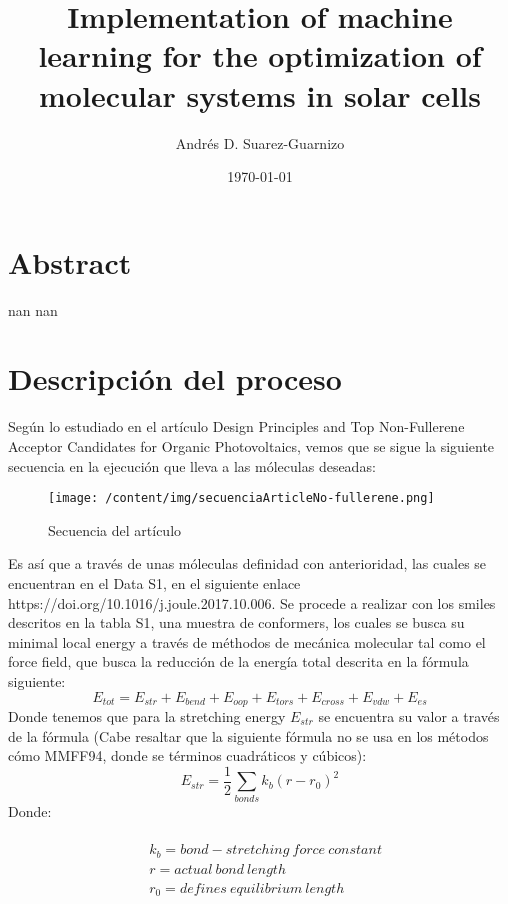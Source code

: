 \documentclass{article}%
\title{Implementation of machine learning for the optimization of molecular systems in solar cells}%
\author{Andrés D. Suarez{-}Guarnizo}%
\date{\today}%
\begin{document}
%
\normalsize%
\maketitle%
\section{Abstract}%
\label{sec:Abstract}%
nan%
nan

%
\section{Descripción del proceso}%
\label{sec:Descripcindelproceso}%
Según lo estudiado en el artículo Design Principles and Top Non{-}Fullerene Acceptor Candidates for Organic Photovoltaics, vemos que se sigue la siguiente secuencia en la ejecución que lleva a las móleculas deseadas:%


\begin{figure}[h!]%
\centering%
\texttt{[image: /content/img/secuenciaArticleNo-fullerene.png]}%
\caption{Secuencia del artículo}%
\end{figure}

%
Es así que a través de unas móleculas definidad con anterioridad, las cuales se encuentran en el Data S1, en el siguiente enlace https://doi.org/10.1016/j.joule.2017.10.006. Se procede a realizar con los smiles descritos en la tabla S1, una muestra de conformers, los cuales se busca su minimal local energy a través de méthodos de mecánica molecular tal como el force field, que busca la reducción de la energía total descrita en la fórmula siguiente:%
\begin{equation}
    E_{tot} = E_{str} + E_{bend} + E_{oop} + E_{tors} + E_{cross} + E_{vdw} + E_{es} 
\end{equation}%
Donde tenemos que para la stretching energy $E_{str}$ se encuentra su valor a través de la fórmula (Cabe resaltar que la siguiente fórmula no se usa en los métodos cómo MMFF94, donde se términos cuadráticos y cúbicos):%
\begin{equation}
    E_{str} = \frac{1}{2} \sum_{bonds} k_b(r-r_0)^2%
\end{equation}%
Donde:
\begin{fleqn}
\begin{equation*}
\begin{alignedat}{2}
\\ &k_b = bond-stretching \ force \ constant \\  
&r = actual\ bond\ length \\ 
&r_0 = defines\ equilibrium\ length\\
\end{alignedat}
\end{equation*}
\end{fleqn}%
\end{document}
